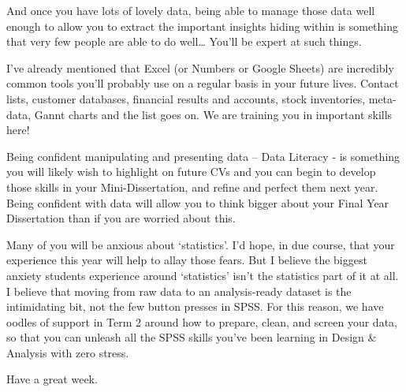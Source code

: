 \documentclass[
  letterpaper,
  DIV=11,
  numbers=noendperiod]{scrartcl}
\begin{document}
And once you have lots of lovely data, being able to manage those data
well enough to allow you to extract the important insights hiding within
is something that very few people are able to do well\ldots{} You'll be
expert at such things.

I've already mentioned that Excel (or Numbers or Google Sheets) are
incredibly common tools you'll probably use on a regular basis in your
future lives. Contact lists, customer databases, financial results and
accounts, stock inventories, meta-data, Gannt charts and the list goes
on. We are training you in important skills here!

Being confident manipulating and presenting data -- Data Literacy - is
something you will likely wish to highlight on future CVs and you can
begin to develop those skills in your Mini-Dissertation, and refine and
perfect them next year. Being confident with data will allow you to
think bigger about your Final Year Dissertation than if you are worried
about this.

Many of you will be anxious about `statistics'. I'd hope, in due course,
that your experience this year will help to allay those fears. But I
believe the biggest anxiety students experience around `statistics'
isn't the statistics part of it at all. I believe that moving from raw
data to an analysis-ready dataset is the intimidating bit, not the few
button presses in SPSS. For this reason, we have oodles of support in
Term 2 around how to prepare, clean, and screen your data, so that you
can unleash all the SPSS skills you've been learning in Design \&
Analysis with zero stress.

Have a great week.
\end{document}
